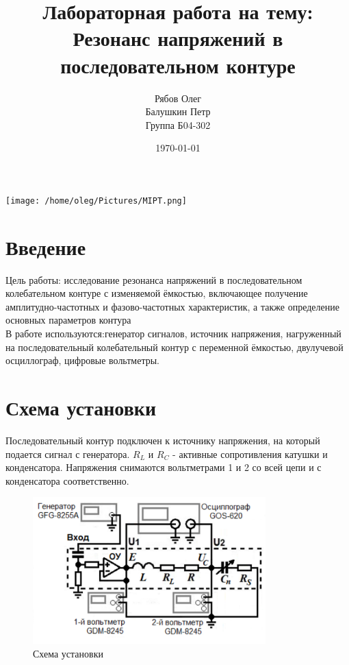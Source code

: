 \documentclass[a4paper, 12pt]{article}
\begin{document}
\begin{titlepage}
    \title{Лабораторная работа на тему: \\    
    Резонанс напряжений в последовательном контуре
    }
    \author{Рябов Олег \\
    Балушкин Петр\\
    Группа Б04-302}
    \date{\today}
    \maketitle
    \vfill
    \begin{center}
        \texttt{[image: /home/oleg/Pictures/MIPT.png]}
    \end{center}
\end{titlepage}

\setcounter{page}{2}
\tableofcontents
\newpage
\section{Введение}
Цель работы: исследование резонанса напряжений в последовательном колебательном 
контуре с
изменяемой ёмкостью, включающее получение амплитудно-частотных и фазово-частотных характеристик, а также определение основных параметров контура
\\

В работе используются:генератор сигналов, источник напряжения, 
нагруженный на последовательный колебательный контур с переменной ёмкостью, двулучевой осциллограф, цифровые вольтметры.
\section{Схема установки}
Последовательный контур подключен к источнику напряжения, на который подается сигнал с генератора.
$R_L$ и $R_C$ - активные сопротивления катушки и конденсатора. Напряжения снимаются вольтметрами 1 и 2 со всей цепи и с конденсатора соответственно.
	
\begin{figure}[h!]
    \centering
    \includegraphics[width=90mm]{./images/ustanovka.png}
    \caption{Схема установки}
\end{figure}
\end{document}
